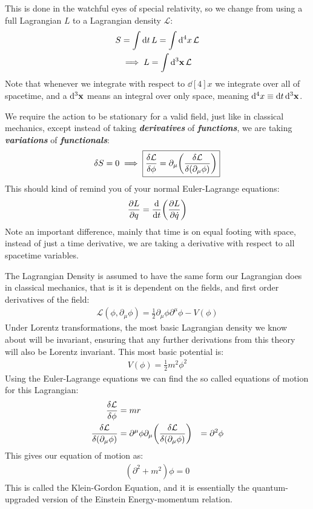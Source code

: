 \documentclass[12pt]{article}
\renewcommand{\L}{\mathcal{L}}
\newcommand{\D}{\partial}
\newcommand{\ddst}{\dd[4]{x}}
\newcommand{\dds}{\dd[3]{\vb{x}}}
\newcommand{\textbm}[1]{\textbf{\emph{#1}}}
\begin{document}
This is done in the watchful eyes of special relativity, so we change from using a full Lagrangian $L$ to a Lagrangian density $\L$:
\begin{gather*}
  S=\int\dd{t}L=\int\dd[4]{x}\L\\
  \implies L=\int\dd[3]{\vb{x}}\L
\end{gather*}
Note that whenever we integrate with respect to $\ddst$ we integrate over all of spacetime, and a $\dds$ means an integral over only space, meaning $\ddst\equiv\dd{t}\dds$.

We require the action to be stationary for a valid field, just like in classical mechanics, except instead of taking \textbm{derivatives} of \textbm{functions}, we are taking \textbm{variations} of \textbm{functionals}:
\begin{align*}
  \delta S=0\implies\boxed{\fdv{\L}{\phi}=\D_\mu\qty(\fdv{\L}{(\D_\mu\phi)})}
\end{align*}
This should kind of remind you of your normal Euler-Lagrange equations:
\begin{align*}
  \pdv{L}{q}=\dv{t}\qty(\pdv{L}{\dot{q}})
\end{align*}
Note an important difference, mainly that time is on equal footing with space, instead of just a time derivative, we are taking a derivative with respect to all spacetime variables.

The Lagrangian Density is assumed to have the same form our Lagrangian does in classical mechanics, that is it is dependent on the fields, and first order derivatives of the field:
\begin{align*}
  \boxed{\L(\phi,\D_\mu\phi)=\frac{1}{2}\D_\mu\phi\D^\mu\phi-V(\phi)}
\end{align*}
Under Lorentz transformations, the most basic Lagrangian density we know about will be invariant, ensuring that any further derivations from this theory will also be Lorentz invariant. This most basic potential is:
\begin{align*}
  V(\phi)=\frac{1}{2}m^2\phi^2
\end{align*}
Using the Euler-Lagrange equations we can find the so called equations of motion for this Lagrangian:
\begin{align*}
  \fdv{\L}{\phi}&=m^^2\\
  \fdv{\L}{(\D_\mu\phi)}&=\D^\mu\phi
  \D_\mu\qty(\fdv{\L}{(\D_\mu\phi)})&=\D^2\phi
\end{align*}
This gives our equation of motion as:
\begin{align*}
  (\D^2+m^2)\phi=0
\end{align*}
This is called the Klein-Gordon Equation, and it is essentially the quantum-upgraded version of the Einstein Energy-momentum relation.
\end{document}
